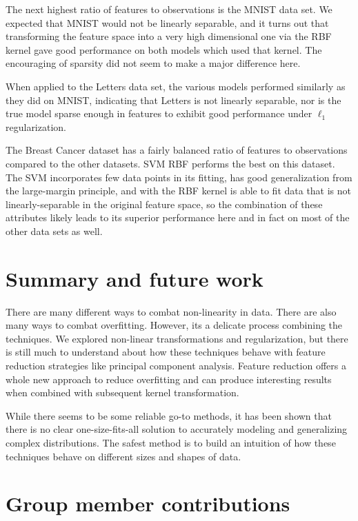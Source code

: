 \documentclass[letterpaper, 11pt]{article}
\begin{document}
The next highest ratio of features to observations is the MNIST data set. We expected that MNIST would not be linearly separable, and it turns out that transforming the feature space into a very high dimensional one via the RBF kernel gave good performance on both models which used that kernel. The encouraging of sparsity did not seem to make a major difference here.

When applied to the Letters data set, the various models performed similarly as they did on MNIST, indicating that Letters is not linearly separable, nor is the true model sparse enough in features to exhibit good performance under $\ell_1$ regularization.

The Breast Cancer dataset has a fairly balanced ratio of features to observations compared to the other datasets. SVM RBF performs the best on this dataset. The SVM incorporates few data points in its fitting, has good generalization from the large-margin principle, and with the RBF kernel is able to fit data that is not linearly-separable in the original feature space, so the combination of these attributes likely leads to its superior performance here and in fact on most of the other data sets as well.

\section{Summary and future work}

There are many different ways to combat non-linearity in data. There are also many ways to combat overfitting. However, its a delicate process combining the techniques. We explored non-linear transformations and regularization, but there is still much to understand about how these techniques behave with feature reduction strategies like principal component analysis. Feature reduction offers a whole new approach to reduce overfitting and can produce interesting results when combined with subsequent kernel transformation.

While there seems to be some reliable go-to methods, it has been shown that there is no clear one-size-fits-all solution to accurately modeling and generalizing complex distributions. The safest method is to build an intuition of how these techniques behave on different sizes and shapes of data.

\section{Group member contributions}
\end{document}
